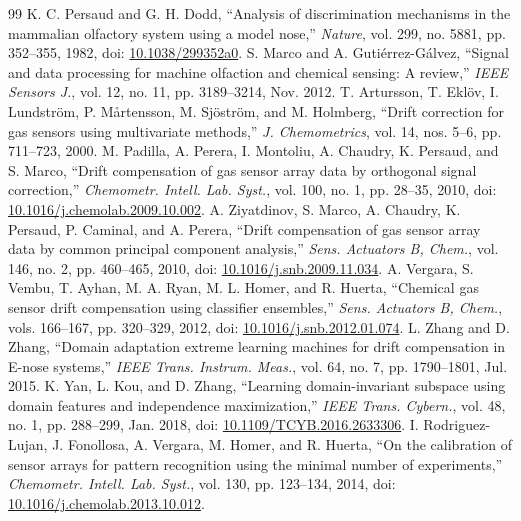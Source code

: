 \begin{thebibliography}{99}
 K. C. Persaud and G. H. Dodd, ``Analysis of discrimination mechanisms in the mammalian olfactory system using a model nose,'' \emph{Nature}, vol. 299, no. 5881, pp. 352--355, 1982, doi: \href{https://doi.org/10.1038/299352a0}{10.1038/299352a0}.
 S. Marco and A. Guti\'errez-G\'alvez, ``Signal and data processing for machine olfaction and chemical sensing: A review,'' \emph{IEEE Sensors J.}, vol. 12, no. 11, pp. 3189--3214, Nov. 2012.
 T. Artursson, T. Ekl\"ov, I. Lundstr\"om, P. M\aa rtensson, M. Sj\"ostr\"om, and M. Holmberg, ``Drift correction for gas sensors using multivariate methods,'' \emph{J. Chemometrics}, vol. 14, nos. 5--6, pp. 711--723, 2000.
 M. Padilla, A. Perera, I. Montoliu, A. Chaudry, K. Persaud, and S. Marco, ``Drift compensation of gas sensor array data by orthogonal signal correction,'' \emph{Chemometr. Intell. Lab. Syst.}, vol. 100, no. 1, pp. 28--35, 2010, doi: \href{https://doi.org/10.1016/j.chemolab.2009.10.002}{10.1016/j.chemolab.2009.10.002}.
 A. Ziyatdinov, S. Marco, A. Chaudry, K. Persaud, P. Caminal, and A. Perera, ``Drift compensation of gas sensor array data by common principal component analysis,'' \emph{Sens. Actuators B, Chem.}, vol. 146, no. 2, pp. 460--465, 2010, doi: \href{https://doi.org/10.1016/j.snb.2009.11.034}{10.1016/j.snb.2009.11.034}.
 A. Vergara, S. Vembu, T. Ayhan, M. A. Ryan, M. L. Homer, and R. Huerta, ``Chemical gas sensor drift compensation using classifier ensembles,'' \emph{Sens. Actuators B, Chem.}, vols. 166--167, pp. 320--329, 2012, doi: \href{https://doi.org/10.1016/j.snb.2012.01.074}{10.1016/j.snb.2012.01.074}.
 L. Zhang and D. Zhang, ``Domain adaptation extreme learning machines for drift compensation in E-nose systems,'' \emph{IEEE Trans. Instrum. Meas.}, vol. 64, no. 7, pp. 1790--1801, Jul. 2015.
 K. Yan, L. Kou, and D. Zhang, ``Learning domain-invariant subspace using domain features and independence maximization,'' \emph{IEEE Trans. Cybern.}, vol. 48, no. 1, pp. 288--299, Jan. 2018, doi: \href{https://doi.org/10.1109/TCYB.2016.2633306}{10.1109/TCYB.2016.2633306}.
 I. Rodriguez-Lujan, J. Fonollosa, A. Vergara, M. Homer, and R. Huerta, ``On the calibration of sensor arrays for pattern recognition using the minimal number of experiments,'' \emph{Chemometr. Intell. Lab. Syst.}, vol. 130, pp. 123--134, 2014, doi: \href{https://doi.org/10.1016/j.chemolab.2013.10.012}{10.1016/j.chemolab.2013.10.012}.

\end{thebibliography}
